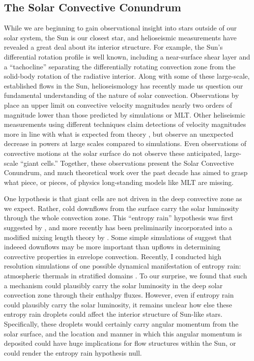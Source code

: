 \documentclass[aasms,12pt]{article}
\begin{document}
\subsection{The Solar Convective Conundrum}
While we are beginning to gain observational insight into stars outside of our solar system, the Sun is our closest star, and helioseismic measurements have revealed a great deal about its interior structure.
For example, the Sun's differential rotation profile is well known, including a near-surface shear layer and a ``tachocline'' separating the differentially rotating convection zone from the solid-body rotation of the radiative interior.
Along with some of these large-scale, established flows in the Sun, helioseismology has recently made us question our fundamental understanding of the nature of solar convection.
Observations by \citet{hanasoge&all2012} place an upper limit on convective velocity magnitudes nearly two orders of magnitude lower than those predicted by simulations or MLT.
Other heliseismic measurements using different techniques claim detections of velocity magnitudes more in line with what is expected from theory \citep{greer&all2015}, but observe an unexpected decrease in powers at large scales compared to simulations.
Even observations of convective motions at the solar surface \citep{hathaway&all2015} do not observe these anticipated, large-scale ``giant cells.''
Together, these observations present the Solar Convective Conundrum, and much theoretical work over the past decade has aimed to grasp what piece, or pieces, of physics long-standing models like MLT are missing.

One hypothesis is that giant cells are not driven in the deep convective zone as we expect.
Rather, cold downflows from the surface carry the solar luminosity through the whole convection zone.
This ``entropy rain'' hypothesis was first suggested by \citet{spruit1997}, and more recently has been preliminarily incorporated into a modified mixing length theory by \citet{brandenburg2016}.
Some simple simulations of \citet{kapyla&all2017} suggest that indeeed downflows may be more important than upflows in determining convective properties in envelope convection.
Recently, I conducted high resolution simulations of one possible dynamical manifestation of entropy rain: atmospheric thermals in stratified domains \citep{andersLB2019}.
To our surprise, we found that such a mechanism could plausibly carry the solar luminosity in the deep solar convection zone through their enthalpy fluxes.
However, even if entropy rain could plausibly carry the solar luminosity, it remains unclear how else these entropy rain droplets could affect the interior structure of Sun-like stars.
Specifically, these droplets would certainly carry angular momentum from the solar surface, and the location and manner in which this angular momentum is deposited could have huge implications for flow structures within the Sun, or could render the entropy rain hypothesis null.
\end{document}
